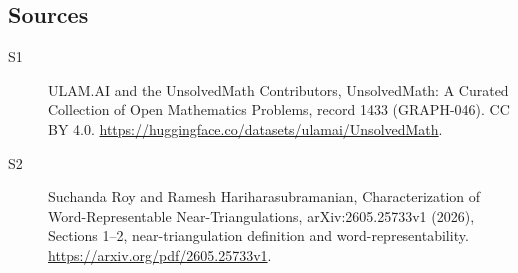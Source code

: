 \documentclass[11pt]{article}
\begin{document}
\subsection{Sources}
\begin{description}
\item[\hypertarget{source:1433:1}{S1}] ULAM.AI and the UnsolvedMath Contributors, UnsolvedMath: A Curated Collection of Open Mathematics Problems, record 1433 (GRAPH-046). CC BY 4.0. \url{https://huggingface.co/datasets/ulamai/UnsolvedMath}.
\item[\hypertarget{source:1433:2}{S2}] Suchanda Roy and Ramesh Hariharasubramanian, Characterization of Word-Representable Near-Triangulations, arXiv:2605.25733v1 (2026), Sections 1--2, near-triangulation definition and word-representability. \url{https://arxiv.org/pdf/2605.25733v1}.
\end{description}
\label{end:1433}
\end{document}
